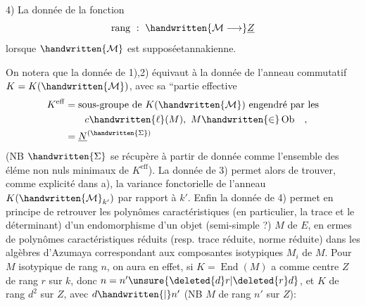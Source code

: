 4) La donnée de la fonction
\[
\operatorname{rang}\ :\ \handwritten{\mathcal{M}\longrightarrow}\underline{Z}
\]
lorsque $\handwritten{\mathcal{M}}$ est supposéetannakienne.

On notera que la donnée de 1),2) équivaut à la donnée de l'anneau commutatif $K=K(\handwritten{\mathcal{M}})$, avec sa ``partie effective
\[
\begin{aligned}
K^{\mathrm{eff}}&=\text{sous-groupe de }K(\handwritten{\mathcal{M}})\text{ engendré par les}\\
&\qquad c\handwritten{\ell}(M),\ M\handwritten{\in}\operatorname{Ob}\quad,\\
&=\underline{N}^{(\handwritten{\Sigma})}
\end{aligned}
\]
(NB $\handwritten{\Sigma}$ se récupère à partir de  donnée comme l'ensemble des éléme non nuls minimaux de $K^{\mathrm{eff}}$). La donnée de 3) permet alors de trouver, comme explicité dans a), la variance fonctorielle de l'anneau $K(\handwritten{\mathcal{M}}_{k'})$ par rapport à $k'$. Enfin la donnée de 4) permet en principe de retrouver les polynômes caractéristiques (en particulier, la trace et le déterminant) d'un endomorphisme d'un objet (semi-simple ?) $M$ de $E$, en ermes de polynômes caractéristiques réduits (resp. trace réduite, norme réduite) dans les algèbres d'Azumaya correspondant aux composantes isotypiques $M_i$ de $M$. Pour $M$ isotypique de rang $n$, on aura en effet, si $K=\operatorname{End}(M)$ a comme centre $Z$ de rang $r$ sur $k$, donc $n=n'\unsure{\deleted{d}r|\deleted{r}d}$, et $K$ de rang $d^2$ sur $Z$, avec $d\handwritten{\mid}n'$ (NB $M$ de rang $n'$ sur $Z$):
